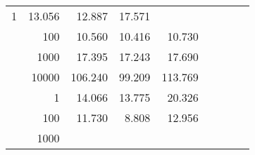 \begin{table}
\begin{tabular}{rrrrrrrrr}
					\multirow{ 1 }{*}{ 1 } &
					
						
							    
							    
	                           13.056 & 12.887 & 17.571  \\
	                
	            
					 &  
					 
					\multirow{ 1 }{*}{ 100 } &
					
						
							    
							    
	                           10.560 & 10.416 & 10.730  \\
	                
	            
					 &  
					 
					\multirow{ 1 }{*}{ 1000 } &
					
						
							    
							    
	                           17.395 & 17.243 & 17.690  \\
	                
	            
					 &  
					 
					\multirow{ 1 }{*}{ 10000 } &
					
						
							    
							    
	                           106.240 & 99.209 & 113.769  \\
	                
	            
	        
				\noalign{\smallskip}\hline
				\multirow{ 4 }{*}{ 160000 } &
				
					
					 
					\multirow{ 1 }{*}{ 1 } &
					
						
							    
							    
	                           14.066 & 13.775 & 20.326  \\
	                
	            
					 &  
					 
					\multirow{ 1 }{*}{ 100 } &
					
						
							    
							    
	                           11.730 & 8.808 & 12.956  \\
	                
	            
					 &  
					 
					\multirow{ 1 }{*}{ 1000 } &
					
						
							    

\end{tabular}
\end{table}
